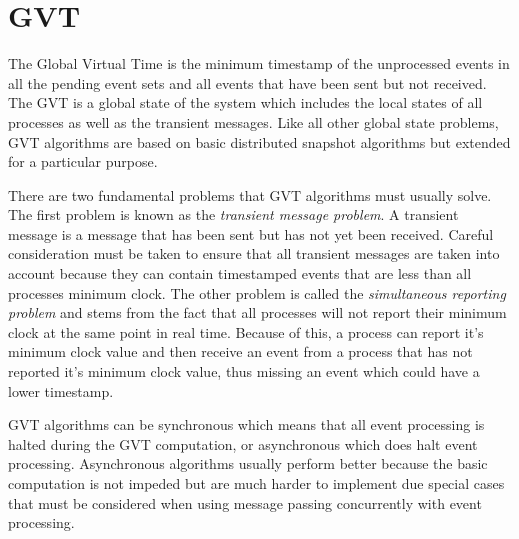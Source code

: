 \documentclass[11pt]{book}
\begin{document}

\section{GVT}

The Global Virtual Time is the minimum timestamp of the unprocessed events in all the pending event
sets and all events that have been sent but not received. The GVT is a global state of the system
which includes the local states of all processes as well as the transient messages. Like all other
global state problems, GVT algorithms are based on basic distributed snapshot algorithms
\cite{chandy-85}\cite{lai-87}\cite{mattern-93} but extended for a particular purpose.

There are two fundamental problems that GVT algorithms must usually solve. The first problem is
known as the \emph{transient message problem}. A transient message is a message that has been sent
but has not yet been received. Careful consideration must be taken to ensure that all transient
messages are taken into account because they can contain timestamped events that are less than all
processes minimum clock. The other problem is called the \emph{simultaneous reporting problem} and
stems from the fact that all processes will not report their minimum clock at the same point in
real time. Because of this, a process can report it's minimum clock value and then receive an event
from a process that has not reported it's minimum clock value, thus missing an event which could have
a lower timestamp.

GVT algorithms can be synchronous which means that all event processing is halted during the GVT 
computation, or asynchronous which does halt event processing. Asynchronous algorithms usually
perform better because the basic computation is not impeded but are much harder to implement due
special cases that must be considered when using message passing concurrently with event processing.
\end{document}
